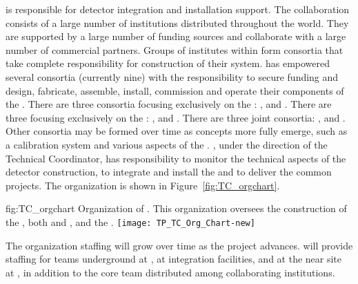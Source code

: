  is responsible for detector integration
and installation support. 
The  collaboration consists of a large number of
institutions distributed throughout the world. They are supported by a
large number of funding sources and collaborate with a large number of
commercial partners. Groups of institutes within  form
consortia that take complete responsibility for construction of their
system.   has empowered several consortia (currently nine)
with the responsibility to secure funding and design, fabricate,
assemble, install, commission and operate their components of the
 . There are three consortia focusing
exclusively on the : ,
\single {} and \single {}. There are three
focusing exclusively on the : 
, \dual {} and \dual {}. There are
three joint consortia: ,  and . Other consortia may
be formed over time as concepts more fully emerge, such as a
 calibration system and various aspects of the .
 , under the direction of the
Technical Coordinator, has responsibility to monitor the
technical aspects of the detector construction, to integrate and
install the  and to deliver the common projects. The
  organization is shown in Figure~\ref{fig:TC_orgchart}.

\begin{dunefigure}{fig:TC_orgchart}
  {Organization of . This organization
 oversees the construction of the , both \single and
 \dual, and the .}
\texttt{[image: TP\_TC\_Org\_Chart-new]}
\end{dunefigure}


The  organization staffing will grow over time as the project
advances.  will provide staffing for teams underground at \surf, at
integration facilities, and at the near site at \fnal, in addition to
the core team distributed among collaborating institutions.

